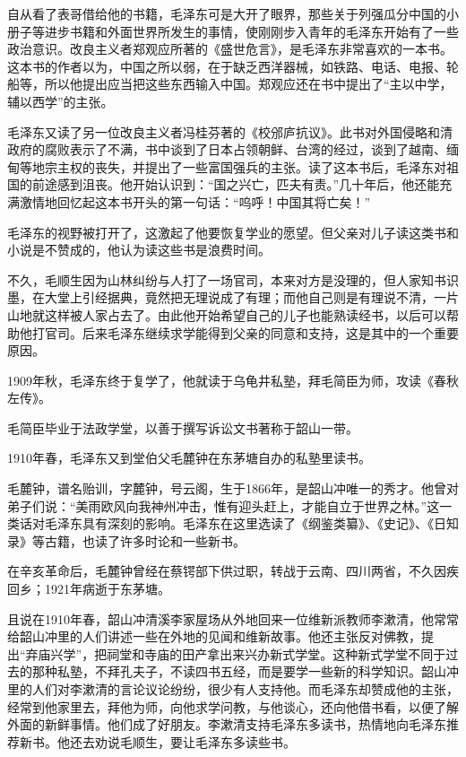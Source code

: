 \documentclass[../../dazhuan.tex]{subfiles}
\begin{document}
自从看了表哥借给他的书籍，毛泽东可是大开了眼界，那些关于列强瓜分中国的小册子等进步书籍和外面世界所发生的事情，使刚刚步入青年的毛泽东开始有了一些政治意识。改良主义者郑观应所著的《盛世危言》，是毛泽东非常喜欢的一本书。这本书的作者以为，中国之所以弱，在于缺乏西洋器械，如铁路、电话、电报、轮船等，所以他提出应当把这些东西输入中国。郑观应还在书中提出了“主以中学，辅以西学”的主张。

毛泽东又读了另一位改良主义者冯桂芬著的《校邠庐抗议》。此书对外国侵略和清政府的腐败表示了不满，书中谈到了日本占领朝鲜、台湾的经过，谈到了越南、缅甸等地宗主权的丧失，并提出了一些富国强兵的主张。读了这本书后，毛泽东对祖国的前途感到沮丧。他开始认识到：“国之兴亡，匹夫有责。”几十年后，他还能充满激情地回忆起这本书开头的第一句话：“呜呼！中国其将亡矣！”

毛泽东的视野被打开了，这激起了他要恢复学业的愿望。但父亲对儿子读这类书和小说是不赞成的，他认为读这些书是浪费时间。

不久，毛顺生因为山林纠纷与人打了一场官司，本来对方是没理的，但人家知书识墨，在大堂上引经据典，竟然把无理说成了有理；而他自己则是有理说不清，一片山地就这样被人家占去了。由此他开始希望自己的儿子也能熟读经书，以后可以帮助他打官司。后来毛泽东继续求学能得到父亲的同意和支持，这是其中的一个重要原因。

1909年秋，毛泽东终于复学了，他就读于乌龟井私塾，拜毛简臣为师，攻读《春秋左传》。

毛简臣毕业于法政学堂，以善于撰写诉讼文书著称于韶山一带。

1910年春，毛泽东又到堂伯父毛麓钟在东茅塘自办的私塾里读书。

毛麓钟，谱名贻训，字麓钟，号云阁，生于1866年，是韶山冲唯一的秀才。他曾对弟子们说：“美雨欧风向我神州冲击，惟有迎头赶上，才能自立于世界之林。”这一类话对毛泽东具有深刻的影响。毛泽东在这里选读了《纲鉴类纂》、《史记》、《日知录》等古籍，也读了许多时论和一些新书。

在辛亥革命后，毛麓钟曾经在蔡锷部下供过职，转战于云南、四川两省，不久因疾回乡；1921年病逝于东茅塘。

且说在1910年春，韶山冲清溪李家屋场从外地回来一位维新派教师李漱清，他常常给韶山冲里的人们讲述一些在外地的见闻和维新故事。他还主张反对佛教，提出“弃庙兴学”，把祠堂和寺庙的田产拿出来兴办新式学堂。这种新式学堂不同于过去的那种私塾，不拜孔夫子，不读四书五经，而是要学一些新的科学知识。韶山冲里的人们对李漱清的言论议论纷纷，很少有人支持他。而毛泽东却赞成他的主张，经常到他家里去，拜他为师，向他求学问教，与他谈心，还向他借书看，以便了解外面的新鲜事情。他们成了好朋友。李漱清支持毛泽东多读书，热情地向毛泽东推荐新书。他还去劝说毛顺生，要让毛泽东多读些书。
\end{document}
